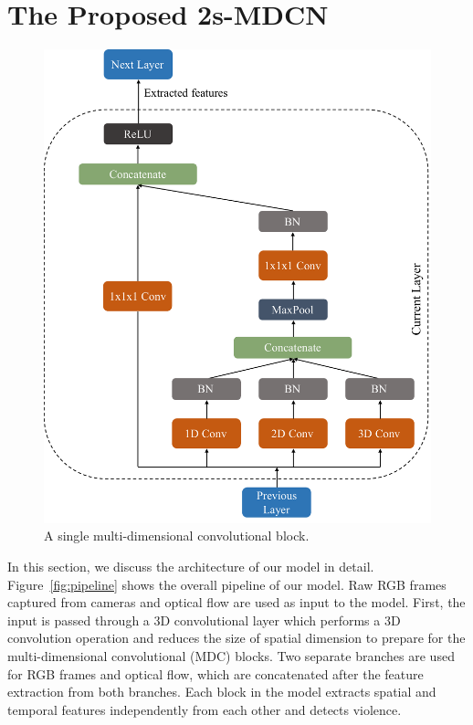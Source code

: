 \section{The Proposed 2s-MDCN}
    \label{mdcn}
    
    \begin{figure}[!htb]
	\centering
	\includegraphics[width=0.9\linewidth]{new_images/mdcn_block.pdf}
	\caption{A single multi-dimensional convolutional block.}
	\label{fig:mdcn_block}
	\end{figure}
    
    In this section, we discuss the architecture of our model in detail. 
    Figure~\ref{fig:pipeline} shows the overall pipeline of our model. 
    Raw RGB frames captured from cameras and optical flow are used as input to the model.
    First, the input is passed through a 3D convolutional layer which performs a 3D convolution operation and reduces the size of spatial dimension to prepare for the multi-dimensional convolutional (MDC) blocks.
    Two separate branches are used for RGB frames and optical flow, which are concatenated after the feature extraction from both branches.
    Each block in the model extracts spatial and temporal features independently from each other and detects violence.
    
